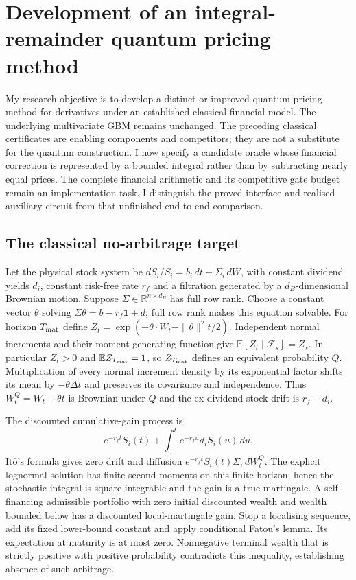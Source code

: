 \section{Development of an integral-remainder quantum pricing method}
\label{sec:integral-remainder-quantum}

My research objective is to develop a distinct or improved quantum pricing
method for derivatives under an established classical financial model.
The underlying multivariate GBM remains unchanged. The preceding classical
certificates are enabling components and competitors; they are not a
substitute for the quantum construction. I now specify a candidate oracle
whose financial correction is represented by a bounded integral rather
than by subtracting nearly equal prices. The complete financial arithmetic
and its competitive gate budget remain an implementation task. I distinguish
the proved interface and realised auxiliary circuit from that unfinished
end-to-end comparison.

\subsection{The classical no-arbitrage target}

Let the physical stock system be
$dS_i/S_i=b_i\,dt+\Sigma_i\,dW$, with constant dividend yields $d_i$,
constant risk-free rate $r_f$ and a filtration generated by a
$d_B$-dimensional Brownian motion. Suppose $\Sigma\in\mathbb R^{n\times d_B}$
has full row rank. Choose a constant vector $\theta$ solving
$\Sigma\theta=b-r_f\mathbf1+d$; full row rank makes this equation solvable.
For horizon $T_{\rm mat}$ define
$Z_t=\exp(-\theta\cdot W_t-\|\theta\|^2t/2)$.
Independent normal increments and their moment generating function give
$\mathbb E[Z_t\mid\mathcal F_s]=Z_s$. In particular $Z_t>0$ and
$\mathbb E Z_{T_{\rm mat}}=1$, so $Z_{T_{\rm mat}}$ defines an equivalent
probability $Q$. Multiplication of every normal increment density by its
exponential factor shifts its mean by $-\theta\Delta t$ and preserves its
covariance and independence. Thus $W^Q_t=W_t+\theta t$ is Brownian under
$Q$ and the ex-dividend stock drift is $r_f-d_i$.

The discounted cumulative-gain process is
\[
 e^{-r_f t}S_i(t)+\int_0^t e^{-r_f u}d_iS_i(u)\,du.
\]
It\^o's formula gives zero drift and diffusion
$e^{-r_f t}S_i(t)\Sigma_i\,dW^Q_t$.
The explicit lognormal solution has finite second moments on this finite
horizon; hence the stochastic integral is square-integrable and the gain
is a true martingale. A self-financing admissible portfolio with zero
initial discounted wealth and wealth bounded below has a discounted
local-martingale gain. Stop a localising sequence, add its fixed lower-bound
constant and apply conditional Fatou's lemma. Its expectation at maturity
is at most zero. Nonnegative terminal wealth that is strictly positive
with positive probability contradicts this inequality, establishing
absence of such arbitrage.

